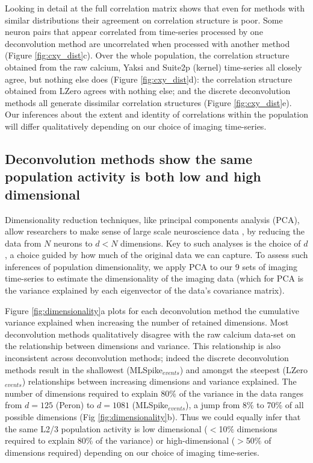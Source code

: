 \documentclass[a4paper,11pt]{article}
\begin{document}
Looking in detail at the full correlation matrix shows that even for methods with similar distributions their agreement on correlation structure is poor. Some neuron pairs that appear correlated from time-series processed by one deconvolution method are uncorrelated when processed with another method (Figure \ref{fig:cxy_dist}c). Over the whole population, the correlation structure obtained from the raw calcium, Yaksi and Suite2p (kernel) time-series all closely agree, but nothing else does (Figure \ref{fig:cxy_dist}d): the correlation structure obtained from LZero agrees with nothing else; and the discrete deconvolution methods all generate dissimilar correlation structures (Figure \ref{fig:cxy_dist}e). Our inferences about the extent and identity of correlations within the population will differ qualitatively depending on our choice of imaging time-series.


\subsection{Deconvolution methods show the same population activity is both low and high dimensional}

Dimensionality reduction techniques, like principal components analysis (PCA), allow researchers to make sense of large scale neuroscience data \citep{Chapin1999-lf,Briggman2005-ht, Churchland2012-jq, Harvey2012-bh, Cunningham2014-vd,Kobak2016-xy}, by reducing the data from $N$ neurons to $d < N$ dimensions. Key to such analyses is the choice of $d$, a choice guided by how much of the original data we can capture. To assess such inferences of population dimensionality, we apply PCA to our 9 sets of imaging time-series to estimate the dimensionality of the imaging data (which for PCA is the variance explained by each eigenvector of the data's covariance matrix). 

Figure \ref{fig:dimensionality}a plots for each deconvolution method the cumulative variance explained when increasing the number of retained dimensions. Most deconvolution methods qualitatively disagree with the raw calcium data-set on the relationship between dimensions and variance. This relationship is also inconsistent across deconvolution methods; indeed the discrete deconvolution methods result in the shallowest (MLSpike$_{events}$) and amongst the steepest (LZero$_{events}$) relationships between increasing dimensions and variance explained. The number of dimensions required to explain 80$\%$ of the variance in the data ranges from $d=125$ (Peron) to $d=1081$ (MLSpike$_{events}$), a jump from 8$\%$ to 70$\%$ of all possible dimensions (Fig \ref{fig:dimensionality}b). Thus we could equally infer that the same L2/3 population activity is low dimensional ($<$10$\%$ dimensions required to explain 80$\%$ of the variance) or high-dimensional ($>$50$\%$ of dimensions required) depending on our choice of imaging time-series. 
\end{document}

